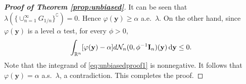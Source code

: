 \documentclass[smallextended]{svjour3}       %
\newcommand{\By}{\mathbf{y}}    \newcommand{\Bz}{\mathbf{z}}
\begin{document}
\begin{proof}[\textbf{Proof of Theorem \ref{prop:unbiased}}]
    It can be seen that $\lambda(\{ \cup_{n=1}^\infty G_{1/n}\}^\complement)= 0$.
    Hence $\varphi (\By) \geq \alpha$ a.e.\ $\lambda$.
    On the other hand, since $\varphi(\By)$ is a level $\alpha$ test, for every $\phi>0$,
    \begin{equation}\label{eq:unbiasedproof1}
        \int_{\mathbb R^n} [\varphi(\By)-\alpha] d\mathcal N_n (0,\phi^{-1} \BI_n)(\By) \,\mathrm{d} \By\leq 0.
    \end{equation}
    Note that the integrand of \eqref{eq:unbiasedproof1} is nonnegative.
    It follows that $\varphi(\By)=\alpha$ a.s.\ $\lambda$, a contradiction.
    This completes the proof.

\end{proof}
\end{document}
